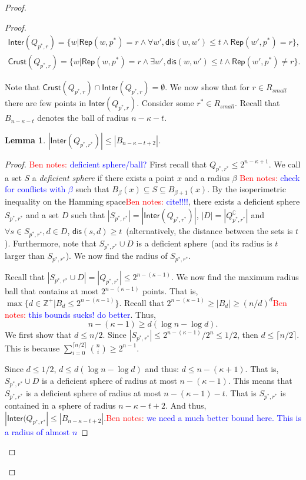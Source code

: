 \documentclass[11pt]{article}
\newcommand{\class}[1]{{\ensuremath{\mathsf{#1}}}}
\newcommand{\rep}{\ensuremath{\class{Rep}}\xspace}
\newcommand{\crust}{\ensuremath{\class{Crust}}\xspace}
\newcommand{\inter}{\ensuremath{\class{Inter}}\xspace}
\newcommand{\dis}{\ensuremath{\mathsf{dis}}}
\newtheorem{lemma}[theorem]{Lemma}
\newcommand{\authnote}[2]{{\textcolor{red}{\textsf{#1 notes: }\textcolor{blue}{ #2}}\marginpar{\textcolor{red}{\textbf{!!!!!}}}}}
\newcommand{\authnote}[2]{}
\newcommand{\bnote}[1]{{\authnote{Ben}{#1}}}
\begin{document}
\begin{proof}
\begin{proof}
\begin{align*}
\inter(Q_{p^*, r}) = \{w | \rep(w, p^*) = r \wedge \forall w', \dis(w, w') \le t \wedge \rep(w', p^*) =r\},\\
\crust(Q_{p^*, r}) = \{w | \rep(w, p^*) = r \wedge \exists w', \dis(w, w')\le t \wedge \rep(w', p^*) \neq r\}.
\end{align*}

Note that $\crust(Q_{p^*, r}) \cap \inter(Q_{p^*,r}) =\emptyset$.  We now show that for $r\in R_{small}$ there are few points in $\inter(Q_{p^*, r})$.  Consider some $r^*\in R_{small}$.  Recall that $B_{n-\kappa-t}$ denotes the ball of radius $n-\kappa -t$.

\begin{lemma}
$|\inter(Q_{p^*, r^*})| \le |B_{n-\kappa -t+2}|$.
\end{lemma}
\begin{proof}
\bnote{deficient sphere/ball?}
First recall that $Q_{p^*, r^*} \le 2^{n-\kappa+1}$.  We call a set $S$ a \emph{deficient sphere} if there exists a point $x$ and a radius $\beta$ \bnote{check for conflicts with $\beta$} such that $B_{\beta}(x) \subseteq S \subseteq B_{\beta+1}(x)$.  By the isoperimetric inequality on the Hamming space\bnote{cite!!!!}, there exists a deficient sphere $S_{p^*, r^*}$ and a set $D$ such that $|S_{p^*, r^*}| = |\inter(Q_{p^*, r^*})|$, $|D| = |Q_{p^*, r^*}^\complement|$ and $\forall s\in S_{p^*, r^*}, d\in D$, $\dis(s, d) \ge t$~(alternatively, the distance between the sets is $t$).  Furthermore, note that $S_{p^*, r^*} \cup D$ is a deficient sphere~(and its radius is $t$ larger than $S_{p^*, r^*}$).
We now find the radius of $S_{p^*, r^*}$.

Recall that $|S_{p^*, r^*} \cup D| = |Q_{p^*, r^*} | \le 2^{n-(\kappa-1)}$.  We now find the maximum radius ball that contains at most $2^{n-(\kappa-1)}$ points.  That is, $\max \{d\in \mathbb{Z^+}| B_d \le 2^{n-(\kappa-1)}\}$.  Recall that $2^{n-(\kappa-1)} \ge |B_d| \ge (n/d)^d$\bnote{this bounds sucks! do better}.  Thus,
\[n-(\kappa-1) \ge d (\log n - \log d).\]  
We first show that $d\le n/2$.  Since $|S_{p^*, r^*} | \le 2^{n-(\kappa-1)}/2^n \le 1/2$, then $d\le \lceil n/2\rceil$.  This is because $\sum_{i=0}^{\lceil n/2 \rceil} {n\choose i} \ge 2^{n-1}$.  

Since $d\le 1/2$, $d\le d(\log n - \log d)$ and thus: $d\le n-(\kappa+1)$.  That is, $S_{p^*, r^*} \cup D$ is a deficient sphere of radius at most $n-(\kappa-1)$.  This means that $S_{p^*, r^*}$ is a deficient sphere of radius at most $n-(\kappa-1)-t$.  That is $S_{p^*, r^*}$ is contained in a sphere of radius $n-\kappa-t+2$. And thus, $|\inter(Q_{p^*, r^*}|\le |B_{n-\kappa-t+2}|$.\bnote{we need a much better bound here.  This is a radius of almost $n$}
\end{proof}


\end{proof}
\end{proof}
\end{document}
